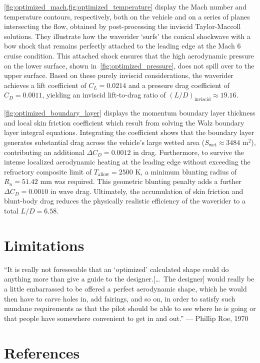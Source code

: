 \documentclass[10pt,a4paper]{article}
\begin{document}
\cref{fig:optimized_mach,fig:optimized_temperature} display the Mach number and temperature contours, respectively, both on the vehicle and on a series of planes intersecting the flow, obtained by post-processing the inviscid Taylor-Maccoll solutions. They illustrate how the waverider `surfs' the conical shockwave with a bow shock that remains perfectly attached to the leading edge at the Mach 6 cruise condition. This attached shock ensures that the high aerodynamic pressure on the lower surface, shown in~\cref{fig:optimized_pressure}, does not spill over to the upper surface. Based on these purely inviscid considerations, the waverider achieves a lift coefficient of $C_L = 0.0214$ and a pressure drag coefficient of $C_D = 0.0011$, yielding an inviscid lift-to-drag ratio of ${(L/D)}_\text{inviscid}\approx19.16$.

\cref{fig:optimized_boundary_layer} displays the momentum boundary layer thickness and local skin friction coefficient which result from solving the Walz boundary layer integral equations. Integrating the coefficient shows that the boundary layer generates substantial drag across the vehicle's large wetted area ($S_{\text{wet}} \approx 3484$ m$^2$), contributing an additional $\Delta C_D = 0.0012$ in drag. Furthermore, to survive the intense localized aerodynamic heating at the leading edge without exceeding the refractory composite limit of $T_{\text{allow}} = 2500$ K, a minimum blunting radius of $R_n = 51.42$ mm was required. This geometric blunting penalty adds a further $\Delta C_D = 0.0010$ in wave drag. Ultimately, the accumulation of skin friction and blunt-body drag reduces the physically realistic efficiency of the waverider to a total $L/D = 6.58$.


\section{Limitations}

``It is really not foreseeable that an `optimized' calculated shape could do anything more than give a guide to the designer.\@ [\ldots\ The designer] would really be a little embarrassed to be offered a perfect aerodynamic shape, which he would then have to carve holes in, add fairings, and so on, in order to satisfy such mundane requirements as that the pilot should be able to see where he is going or that people have somewhere convenient to get in and out.'' --- Phillip Roe, 1970

\FloatBarrier%
\section{References}
\printbibliography%
\end{document}
